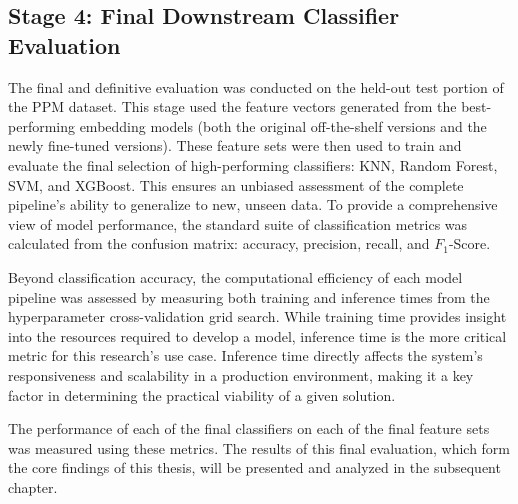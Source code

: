 \subsection{Stage 4: Final Downstream Classifier Evaluation}
The final and definitive evaluation was conducted on the held-out test portion of the PPM dataset. This stage used the feature vectors generated from the best-performing embedding models (both the original off-the-shelf versions and the newly fine-tuned versions). These feature sets were then used to train and evaluate the final selection of high-performing classifiers: KNN, Random Forest, SVM, and XGBoost. This ensures an unbiased assessment of the complete pipeline's ability to generalize to new, unseen data. To provide a comprehensive view of model performance, the standard suite of classification metrics was calculated from the confusion matrix: accuracy, precision, recall, and \(F_1\)-Score.

Beyond classification accuracy, the computational efficiency of each model pipeline was assessed by measuring both training and inference times from the hyperparameter cross-validation grid search. While training time provides insight into the resources required to develop a model, inference time is the more critical metric for this research's use case. Inference time directly affects the system's responsiveness and scalability in a production environment, making it a key factor in determining the practical viability of a given solution.

The performance of each of the final classifiers on each of the final feature sets was measured using these metrics. The results of this final evaluation, which form the core findings of this thesis, will be presented and analyzed in the subsequent chapter.